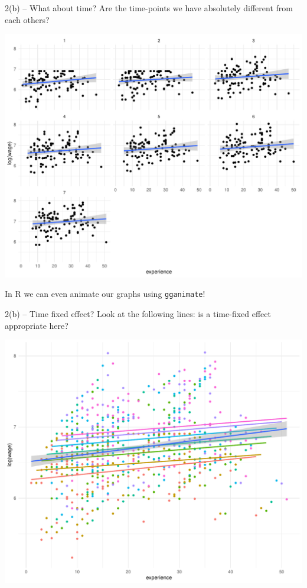 \documentclass[xcolor=table,dvipsnames]{beamer}
\begin{document}
\begin{frame}{2(b) -- What about time?}
Are the time-points we have absolutely different from each others?
\begin{center}
\includegraphics[scale=0.33]{pictures/week_23_timescatter.pdf}
\end{center} \pause
In R we can even animate our graphs using \texttt{gganimate}!
\end{frame}

\begin{frame}{2(b) -- Time fixed effect?}
Look at the following lines: is a time-fixed effect appropriate here?
\begin{center}
\includegraphics[scale=0.4]{pictures/week_23_yearfe.pdf}
\end{center}
\end{frame}
\end{document}
